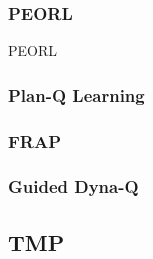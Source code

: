 \subsubsection{PEORL}
PEORL \cite{DBLP:journals/corr/abs-1804-07779}
\subsubsection{Plan-Q Learning}
\cite{10.1007/978-3-540-77949-0_6}
\subsubsection{FRAP}
\cite{DBLP:journals/corr/abs-2006-15009}
\subsubsection{Guided Dyna-Q}
\cite{Hayamizu2021GuidingRE}
\subsection{TMP}
\cite{Jiang2019TaskMotionPW}


